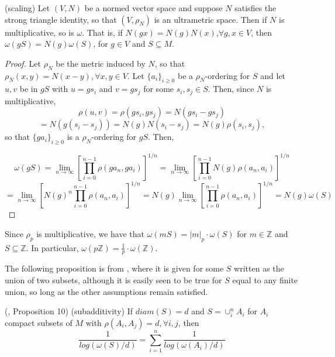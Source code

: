 \begin{proposition}
(scaling)	Let $(V, N)$ be a normed vector space and suppose $N$ satisfies the strong triangle identity, so that $(V,\rho_N)$ is an ultrametric space. Then if $N$ is multiplicative, so is $\omega$. That is, if $N(gx)=N(g)N(x)$,$\forall g,x \in V$, then $\omega(gS) = N(g)  \omega(S)$, for $g \in V$ and $S \subseteq M$. 
\end{proposition}

\begin{proof}
	Let $\rho_N$ be the metric induced by $N$, so that $\rho_N(x,y) = N(x-y), \forall x,y \in V$. Let $\{a_i\}_{i\geq 0}$ be a $\rho_N$-ordering for $S$ and let $u, v$ be in $gS$ with $u=gs_i$ and $v=gs_j$ for some $s_i, s_j \in S$. Then, since $N$ is multiplicative, \[\rho(u, v) = \rho(gs_i, gs_j) =N(gs_i - gs_j)\] 
	\[ = N(g(s_i - s_j)) = N(g)N(s_i - s_j) = N(g)\rho(s_i,s_j),\]
	so that $\{ga_i\}_{i\geq 0}$ is a $\rho_N$-ordering for $gS$. Then,
	
	$$\omega(gS) = \lim_{n\to\infty} [\prod_{i=0}^{n-1} \rho(ga_n,ga_i)]^{1/n} 
	= \lim_{n\to\infty} [\prod_{i=0}^{n-1} N(g)\rho(a_n,a_i)]^{1/n} $$
	$$= \lim_{n\to\infty} [N(g)^n\prod_{i=0}^{n-1} \rho(a_n,a_i)]^{1/n} = N(g) \lim_{n\to\infty} [\prod_{i=0}^{n-1} \rho(a_n,a_i)]^{1/n} = N(g) \omega(S)$$
\end{proof}


\begin{example}
	Since $\rho_p$ is multiplicative, we have that $\omega(mS) = \lvert m \rvert_p\cdot \omega(S)$ for $m \in \mathbb{Z}$ and $S \subseteq \mathbb{Z}$. In particular, $\omega(p\mathbb{Z}) = \frac{1}{p}\cdot \omega(\mathbb{Z})$. %
\end{example}

The following proposition is from \cite{kj}, where it is given for some $S$  written as the union of two subsets, although it is easily seen to be true for $S$ equal to any finite union, so long as the other assumptions remain satisfied.\\  

\begin{proposition}
	(\cite{kj}, Proposition 10) (subadditivity) If  $diam(S)=d$ and $S=\cup_i^n A_i$ for $A_i$ compact subsets of $M$ with $\rho(A_i, A_j)=d, \forall i,j$, then \[\frac{1}{log(\omega(S)/d) } = \sum_{i=1}^n \frac{1}{log(\omega(A_i)/d)}\] 
\end{proposition}


